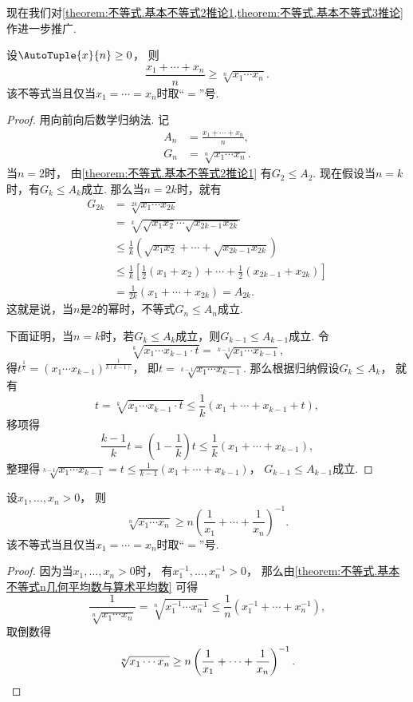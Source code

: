现在我们对\cref{theorem:不等式.基本不等式2推论1,theorem:不等式.基本不等式3推论} 作进一步推广.
\begin{proposition}\label{theorem:不等式.基本不等式n几何平均数与算术平均数}
设\(\AutoTuple{x}{n}\geq0\)，
则\[
	\frac{x_1+\dotsb+x_n}{n} \geq \sqrt[n]{x_1 \dotsm x_n}.
\]
该不等式当且仅当\(x_1=\dotsb=x_n\)时取“\(=\)”号.
\begin{proof}
用向前向后数学归纳法.
记\begin{align*}
	A_n &= \frac{x_1+\dotsb+x_n}{n}, \\
	G_n &= \sqrt[n]{x_1 \dotsm x_n}.
\end{align*}
当\(n=2\)时，
由\cref{theorem:不等式.基本不等式2推论1}
有\(G_2 \leq A_2\).
现在假设当\(n=k\)时，有\(G_k \leq A_k\)成立.
那么当\(n=2k\)时，就有\begin{align*}
	G_{2k}
	&= \sqrt[2k]{x_1 \dotsm x_{2k}} \\
	&= \sqrt[k]{
		\sqrt{x_1 x_2} \dotsm \sqrt{x_{2k-1} x_{2k}}
	} \\
	&\leq \frac1k (
		\sqrt{x_1 x_2} + \dotsb + \sqrt{x_{2k-1} x_{2k}}
	) \\
	&\leq \frac1k \left[
		\frac12(x_1 + x_2) + \dotsb + \frac12(x_{2k-1} + x_{2k})
	\right] \\
	&= \frac{1}{2k} (x_1 + \dotsb + x_{2k})
	= A_{2k}.
\end{align*}
这就是说，当\(n\)是\(2\)的幂时，不等式\(G_n \leq A_n\)成立.

下面证明，当\(n=k\)时，若\(G_k \leq A_k\)成立，则\(G_{k-1} \leq A_{k-1}\)成立.
令\[
	\sqrt[k]{x_1 \dotsm x_{k-1} \cdot t}
	= \sqrt[k-1]{x_1 \dotsm x_{k-1}},
\]
得\(t^{\frac1k}
= (x_1 \dotsm x_{k-1})^{\frac{1}{k(k-1)}}\)，
即\(t = \sqrt[k-1]{x_1 \dotsm x_{k-1}}\).
那么根据归纳假设\(G_k \leq A_k\)，
就有\[
	t = \sqrt[k]{x_1 \dotsm x_{k-1} \cdot t}
	\leq \frac1k (x_1 + \dotsb + x_{k-1} + t),
\]
移项得\[
	\frac{k-1}{k} t
	= \left(1-\frac1k\right) t
	\leq \frac1k (x_1 + \dotsb + x_{k-1}),
\]
整理得\(\sqrt[k-1]{x_1 \dotsm x_{k-1}}
= t \leq \frac{1}{k-1} (x_1 + \dotsb + x_{k-1})\)，
\(G_{k-1} \leq A_{k-1}\)成立.
\end{proof}
\end{proposition}

\begin{corollary}\label{theorem:不等式.基本不等式n几何平均数与调和平均数}
设\(x_1,\dotsc,x_n>0\)，
则\[
	\sqrt[n]{x_1 \dotsm x_n}
	\geq n \left(\frac{1}{x_1} + \dotsb + \frac{1}{x_n}\right)^{-1}.
\]
该不等式当且仅当\(x_1=\dotsb=x_n\)时取“\(=\)”号.
\begin{proof}
因为当\(x_1,\dotsc,x_n>0\)时，
有\(x_1^{-1},\dotsc,x_n^{-1}>0\)，
那么由\cref{theorem:不等式.基本不等式n几何平均数与算术平均数} 可得\[
	\frac{1}{\sqrt[n]{x_1 \dotsm x_n}}
	= \sqrt[n]{x_1^{-1} \dotsm x_n^{-1}}
	\leq \frac1n (x_1^{-1} + \dotsb + x_n^{-1}),
\]
取倒数得\[
	\sqrt[n]{x_1 \dotsm x_n}
	\geq n \left(\frac{1}{x_1} + \dotsb + \frac{1}{x_n}\right)^{-1}.
	\qedhere
\]
\end{proof}
\end{corollary}

